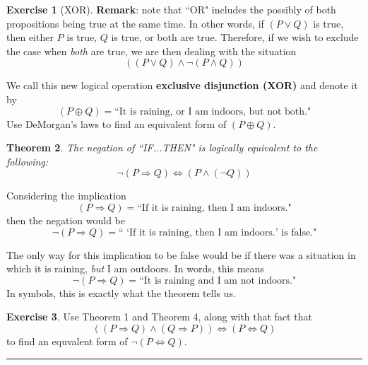 \documentclass[12pt]{article}
\renewcommand{\_}[1]{\underline{ #1 }}
\newtheorem{theorem}{\color{navy}Theorem}
\theoremstyle{definition}
\newtheorem{exercise}[theorem]{\color{orange}Exercise}
\numberwithin{equation}{subsection}
\begin{document}

\begin{exercise}[XOR]
    \textbf{Remark}: note that ``OR" includes the possibly of both propositions being true at the same time. In other words, if $(P\lor Q)$ is true, then either $P$ is true, $Q$ is true, or both are true. Therefore, if we wish to exclude the case when \emph{both} are true, we are then dealing with the situation
    $$
        ((P\lor Q) \land \neg(P\land Q))
    $$
    
    We call this new logical operation \textbf{exclusive disjunction (XOR)} and denote it by
    $$
        (P\oplus Q) = \text{``It is raining, or I am indoors, but not both."}
    $$
    Use DeMorgan's laws to find an equivalent form of $(P\oplus Q)$.
    
\end{exercise}


\begin{theorem}
    The negation of ``IF...THEN" is logically equivalent to the following:
    $$\neg(P \Longrightarrow Q) \Longleftrightarrow (P \land (\neg Q))$$
\end{theorem}

Considering the implication \[
	  (P \Longrightarrow Q) = \text{``If it is raining, then I am indoors."}
	\]
then the negation would be
    \[
	  \neg(P \Longrightarrow Q) = \text{`` `If it is raining, then I am indoors.' is false."}
	\]

The only way for this implication to be false would be if there was a situation in which it is raining, \emph{but} I am outdoors. In words, this means
    \[
	  \neg(P \Longrightarrow Q) = \text{``It is raining and I am not indoors."}
	\]
In symbols, this is exactly what the theorem tells us.


\begin{exercise}
    Use Theorem 1 and Theorem 4, along with that fact that
    \[
    ((P \Longrightarrow Q) \land (Q \Longrightarrow P)) \Longleftrightarrow (P \Longleftrightarrow Q)
    \]
    to find an equvalent form of $\neg(P \Longleftrightarrow Q)$.
\end{exercise}

\hrule
\end{document}
